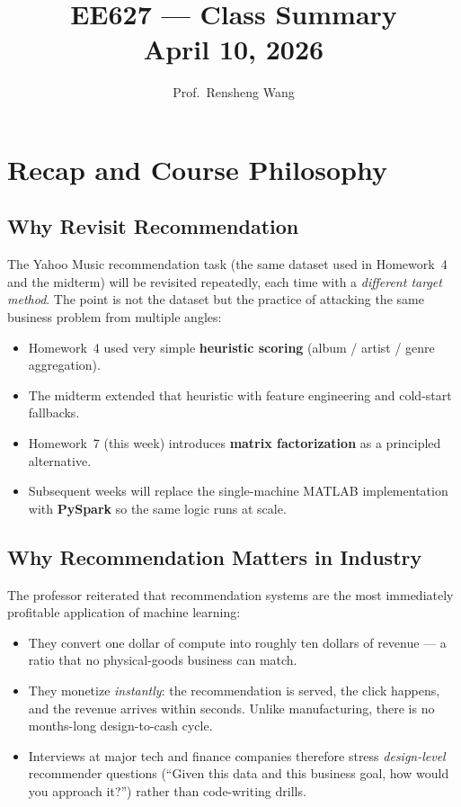 \documentclass[11pt]{article}
\title{\textbf{EE627 --- Class Summary}\\[0.4em]
       \large April 10, 2026}
\author{Prof.\ Rensheng Wang}
\date{}
\begin{document}
\maketitle
\tableofcontents
\newpage

\section{Recap and Course Philosophy}

\subsection{Why Revisit Recommendation}
The Yahoo Music recommendation task (the same dataset used in Homework~4 and the midterm) will be revisited repeatedly, each time with a \emph{different target method}. The point is not the dataset but the practice of attacking the same business problem from multiple angles:

\begin{itemize}
    \item Homework~4 used very simple \textbf{heuristic scoring} (album / artist / genre aggregation).
    \item The midterm extended that heuristic with feature engineering and cold-start fallbacks.
    \item Homework~7 (this week) introduces \textbf{matrix factorization} as a principled alternative.
    \item Subsequent weeks will replace the single-machine MATLAB implementation with \textbf{PySpark} so the same logic runs at scale.
\end{itemize}

\subsection{Why Recommendation Matters in Industry}
The professor reiterated that recommendation systems are the most immediately profitable application of machine learning:

\begin{itemize}
    \item They convert one dollar of compute into roughly ten dollars of revenue --- a ratio that no physical-goods business can match.
    \item They monetize \emph{instantly}: the recommendation is served, the click happens, and the revenue arrives within seconds. Unlike manufacturing, there is no months-long design-to-cash cycle.
    \item Interviews at major tech and finance companies therefore stress \emph{design-level} recommender questions (``Given this data and this business goal, how would you approach it?'') rather than code-writing drills.
\end{itemize}
\end{document}
